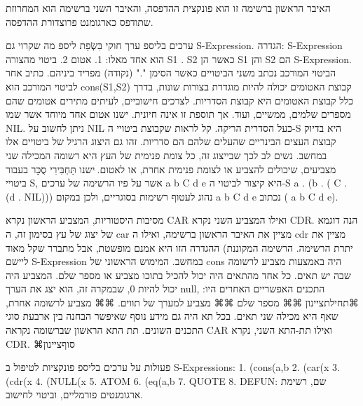       האיבר הראשון ברשימה זו הוא פונקצית ההדפסה, והאיבר השני ברשימה הוא המחרוזת
      שתודפס כארגומנט פרוצדורת ההדפסה.

      ערכים בליספ
      ערך חוקי בִּשְׂפַת ליספ מה שקרוי גם S-Expression.
      הגדרה: S-Expression הוא אחד מאלו:
      1. אטום
      2. ביטוי מהצורה S1 . S2 כאשר הן S1 והן S2 הם
      S-Expression. הביטוי המורכב נכתב משני הביטויים
      כאשר הסימן "." (נקודה) מפריד ביניהם. כתיב אחר
      לביטוי המורכב הוא cons(S1,S2) קבוצת האטומים
      יכולה להיות מוגדרת בצורות שונות, בדרך כלל
      קבוצת האטומים היא קבוצת הסדריות. לצרכים
      חישוביים, לעיתים מתירים אטומים שהם מספרים
      שלמים, ממשיים, ועוד. אך תוספת זו אינה חיונית.
      ישנו אטום אחד מיוחד אשר שמו NIL. ניתן לחשוב על
      NIL כעל הסדרית הריקה.
      קל לראות שקבוצת ביטויי ה-S היא בדיוק קבוצת העצים הבינריים שהעלים שלהם הם סדריות. זהו גם היצוג הרגיל של ביטויים אלו במחשב. נשים לב לכך שבייצוג זה, כל צומת פנימית של העץ היא רשומה המכילה שני מצביעים, שיכולים להצביע או לצומת פנימית אחרת, או לאטום.
      ּישנו תַּחְבִּירִי סֻכָּר בעבור ביטויי S, אשר על פיו הרשימה של ערכים a b C d e היא קיצור לביטוי ה-S
      a . (b . ( C . (d . NIL)))
      נהוג לעטוף רשימות בסוגריים, ולכן במקום a b C d e נכתוב ( a b C d e).

      מסיבות היסטוריות, המצביע הראשון נקרא CAR ואילו המצביע השני נקרא CDR. הנה דוגמא
      של יצוג של עץ בסימון זה, ה car מציין את האיבר הראשון ברשימה, ואילו ה cdr מציין
      את יתרת הרשימה. הרשימה המקוננת)
      ההגדרה הזו היא אמנם מופשטת, אבל מתברר שקל מאוד ליישם S-Expression במחשב. המימוש הראשוני של cons היה באמצעות מצביע לרשומה שבה יש תאים. כל אחד מהתאים היה יכול להכיל בתוכו מצביע או מספר שלם. המצביע היה יכול להיות 0, שבמקרה זה, הוא יצג את הערך null,
      התכנים האפשריים האחרים היו:
      ⌘תחילת{ציינון}
      ⌘⌘ מספר שלם
      ⌘⌘ מצביע למערך של תווים.
      ⌘⌘ מצביע לרשומה אחרת, שאף היא מכילה שני תאים.
      בכל תא היה גם מידע נוסף שאיפשר הבחנה בין ארבעת סוגי התכנים השונים.
      תת התא הראשון שברשומה נקראה CAR ואילו תת-התא השני, נקרא CDR.
  ⌘סוף{ציינון}

      פעולות על ערכים בליספ
      פונקציות לטיפול ב S-Expressions:
      1. (cons(a,b
      2. (car(x
      3. (cdr(x
      4. (NULL(x
      5. ATOM
      6. (eq(a,b
      7. QUOTE
      8. DEFUN: שם, רשימת ארגומנטים פורמליים, וביטוי לחישוב.

